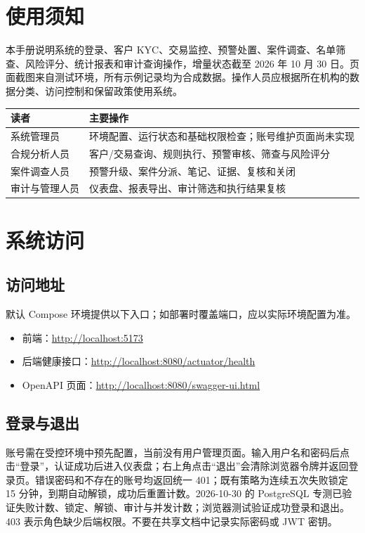 \documentclass[UTF8,openany,zihao=-4]{ctexrep}
\begin{document}
\chapter*{使用须知}
本手册说明系统的登录、客户 KYC、交易监控、预警处置、案件调查、名单筛查、风险评分、统计报表和审计查询操作，增量状态截至 2026 年 10 月 30 日。页面截图来自测试环境，所有示例记录均为合成数据。操作人员应根据所在机构的数据分类、访问控制和保留政策使用系统。

\begin{longtable}{p{}p{}}
\toprule 读者 & 主要操作 \\ \midrule
系统管理员 & 环境配置、运行状态和基础权限检查；账号维护页面尚未实现 \\
合规分析人员 & 客户/交易查询、规则执行、预警审核、筛查与风险评分 \\
案件调查人员 & 预警升级、案件分派、笔记、证据、复核和关闭 \\
审计与管理人员 & 仪表盘、报表导出、审计筛选和执行结果复核 \\
\bottomrule
\end{longtable}
\tableofcontents
\clearpage
{}

\chapter{系统访问}
\section{访问地址}
默认 Compose 环境提供以下入口；如部署时覆盖端口，应以实际环境配置为准。
\begin{itemize}
  \item 前端：\url{http://localhost:5173}
  \item 后端健康接口：\url{http://localhost:8080/actuator/health}
  \item OpenAPI 页面：\url{http://localhost:8080/swagger-ui.html}
\end{itemize}

\section{登录与退出}
账号需在受控环境中预先配置，当前没有用户管理页面。输入用户名和密码后点击“登录”，认证成功后进入仪表盘；右上角点击“退出”会清除浏览器令牌并返回登录页。错误密码和不存在的账号均返回统一 401；既有策略为连续五次失败锁定 15 分钟，到期自动解锁，成功后重置计数。2026-10-30 的 PostgreSQL 专测已验证失败计数、锁定、解锁、审计与并发计数；浏览器测试验证成功登录和退出。403 表示角色缺少后端权限。不要在共享文档中记录实际密码或 JWT 密钥。
\end{document}
